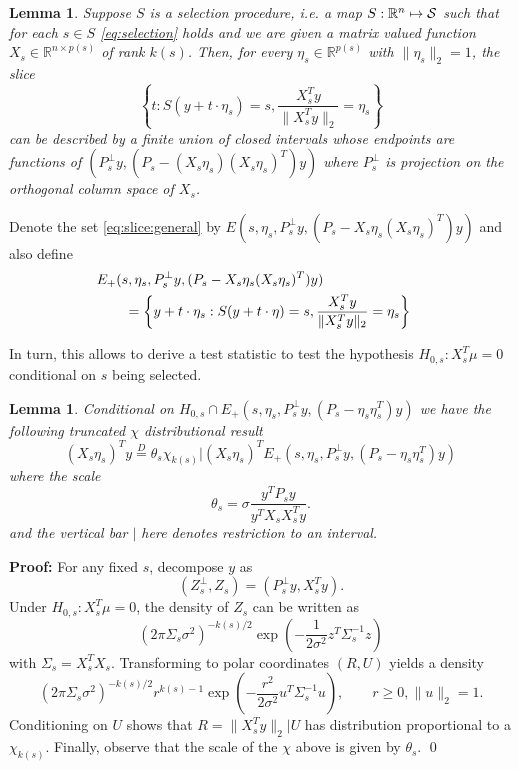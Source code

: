 \documentclass{imsart}
\newcommand{\real}{\mathbb{R}}
\newtheorem{lemma}[theorem]{Lemma}
\begin{document}
\begin{lemma}
Suppose $S$ is a selection procedure, i.e. a map $S:\real^n \mapsto {\cal S}$
such that for each $s \in S$ \eqref{eq:selection} holds 
and we are given a matrix valued function $X_s \in \real^{n \times p(s)}$ of rank
$k(s)$.
Then, for every $\eta_s \in \real^{p(s)}$ with $\|\eta_s\|_2=1$, the
slice
\begin{equation}
\label{eq:slice:general}
\left\{t: S(y+t \cdot \eta_s)=s, \frac{X_s^Ty}{\|X_s^Ty\|_2}=\eta_s \right\}
\end{equation}
can be described by
a finite union of closed intervals whose endpoints are functions of 
$(P_s^{\perp}y, (P_s- (X_s\eta_s)(X_s\eta_s)^T)y)$ where
$P_s^{\perp}$ is projection on the orthogonal column space of $X_s$.
\end{lemma}
Denote the set \eqref{eq:slice:general} by $E(s, \eta_s, P_s^{\perp}y, (P_s - X_s \eta_s(X_s\eta_s)^T)y)$ and also define
$$
\begin{aligned}
\lefteqn{
E_+(s, \eta_s, P_s^{\perp}y, (P_s - X_s \eta_s(X_s\eta_s)^T)y) } \\
 & \qquad = \left\{y + t \cdot \eta_s: S(y+t \cdot \eta)=s, \frac{X_s^Ty}{\|X_s^Ty\|_2}=\eta_s \right\} \\
\end{aligned}
$$

In turn, this allows to derive a test statistic to test the hypothesis
$H_{0,s}:X_s^T\mu=0$ conditional on $s$ being selected.
\begin{lemma}
\label{eq:test:dbn}
Conditional on $H_{0,s} \cap E_+(s, \eta_s, P_s^{\perp}y, (P_s - \eta_s\eta_s^T)y)$
we have the following truncated $\chi$ distributional result
\begin{equation}
\label{eq:chi:truncated}
(X_s\eta_s)^Ty \overset{D}{=} \theta_s \chi_{k(s)} | (X_s\eta_s)^TE_+(s, \eta_s, P_s^{\perp}y, (P_s - \eta_s\eta_s^T)y) 
\end{equation}
where the scale 
$$
\theta_s = \sigma \frac{y^TP_sy}{y^TX_sX_s^Ty}.
$$
and the vertical bar $|$ here denotes restriction to an interval.
\end{lemma}

{\bf Proof:}
For any fixed $s$, decompose $y$ as
$$
(Z^{\perp}_s,Z_s) = (P_s^{\perp}y, X_s^Ty).
$$
Under $H_{0,s}:X_s^T\mu=0$, the density of $Z_s$ can be written as
$$
(2 \pi \Sigma_s \sigma^2)^{-k(s)/2} \exp \left(-\frac{1}{2 \sigma^2} z^T\Sigma_s^{-1}z \right)
$$
with $\Sigma_s = X_s^TX_s$.
Transforming to polar coordinates $(R,U)$ yields a density
$$
(2 \pi \Sigma_s \sigma^2)^{-k(s)/2} r^{k(s)-1} \exp \left(-\frac{r^2}{2 \sigma^2} u^T\Sigma_s^{-1}u \right), \qquad r \geq 0, \|u\|_2=1.
$$
Conditioning on $U$ shows that $R=\|X_s^Ty\|_2|U$ has distribution proportional to a $\chi_{k(s)}$. Finally, observe that 
the scale of the $\chi$ above is given by $\theta_s$. \qed
\end{document}
